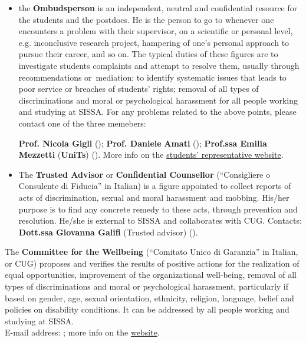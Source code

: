 \documentclass{sissavademecum}
\begin{document}
\begin{itemize}
	\item the \textbf{Ombudsperson} is an independent, neutral and confidential resource for the students and the postdocs. He is the person to go to whenever one encounters a problem with their supervisor, on a scientific or personal level, e.g. inconclusive research project, hampering of one's personal approach to pursue their career, and so on. The typical duties of these figures are to investigate students complaints and attempt to resolve them, usually through recommendations or~mediation; to identify systematic issues that leads to poor service or breaches of students' rights; removal of all types of discriminations and moral or psychological harassment for all people working and studying at SISSA. For any problems related to the above points, please contact one of the three memebers:
	
	\textbf{Prof. Nicola Gigli} (); \textbf{Prof. Daniele }\textbf{Amati} (); \textbf{Prof.ssa Emilia Mezzetti} (\textbf{UniTs}) \textbf{}(). More info on the \href{http://students.sissa.it/issues/ombudsperson.html}{students' representative website}.
	
	\item The\textbf{ Trusted Advisor} or \textbf{Confidential Counsellor }(``Consigliere o Consulente di Fiducia'' in Italian) is a figure appointed to collect reports of acts of discrimination, sexual and moral harassment and mobbing. His/her purpose is to find any concrete remedy to these acts, through prevention and resolution. He/she is external to SISSA and collaborates with CUG. Contacts: \textbf{Dott.ssa Giovanna Galifi} (Trusted advisor) ().
\end{itemize}



The \textbf{Committee for the Wellbeing} (``Comitato Unico di Garanzia'' in Italian, or CUG) proposes and verifies the results of positive actions for the realization of equal opportunities, improvement of the organizational well-being, removal of all types of discriminations and moral or psychological harassment, particularly if based on gender, age, sexual orientation, ethnicity, religion, language, belief and policies on disability conditions. It can be addressed by all people working and studying at SISSA.\\
E-mail address: ; more info on the \href{http://www.sissa.it/committee-wellbeing-cug}{website}.
\end{document}
